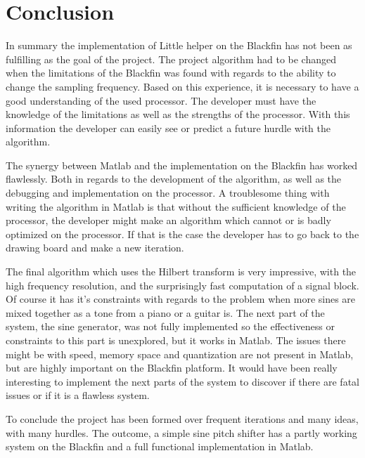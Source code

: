 
\chapter{Conclusion}
In summary the implementation of Little helper on the Blackfin has not been as fulfilling as the goal of the project.
The project algorithm had to be changed when the limitations of the Blackfin was found with regards to the ability to change the sampling frequency.
Based on this experience, it is necessary to have a good understanding of the used processor.
The developer must have the knowledge of the limitations as well as the strengths of the processor.
With this information the developer can easily see or predict a future hurdle with the algorithm.

The synergy between Matlab and the implementation on the Blackfin has worked flawlessly.
Both in regards to the development of the algorithm, as well as the debugging and implementation on the processor. 
A troublesome thing with writing the algorithm in Matlab is that without the sufficient knowledge of the processor, the developer might make an algorithm which cannot or is badly optimized on the processor.
If that is the case the developer has to go back to the drawing board and make a new iteration.

The final algorithm which uses the Hilbert transform is very impressive, with the high frequency resolution, and the surprisingly fast computation of a signal block.
Of course it has it's constraints with regards to the problem when more sines are mixed together as a tone from a piano or a guitar is.
The next part of the system, the sine generator, was not fully implemented so the effectiveness or constraints to this part is unexplored, but it works in Matlab.
The issues there might be with speed, memory space and quantization are not present in Matlab, but are highly important on the Blackfin platform.
It would have been really interesting to implement the next parts of the system to discover if there are fatal issues or if it is a flawless system.

To conclude the project has been formed over frequent iterations and many ideas, with many hurdles.
The outcome, a simple sine pitch shifter has a partly working system on the Blackfin and a full functional implementation in Matlab.
  
\FloatBarrier